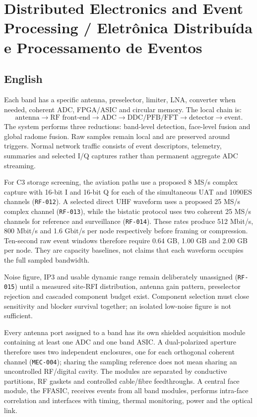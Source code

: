 \chapter{Distributed Electronics and Event Processing / Eletrônica Distribuída e Processamento de Eventos}

\section*{English}
Each band has a specific antenna, preselector, limiter, LNA, converter when needed, coherent ADC, FPGA/ASIC and circular memory. The local chain is:
\[
\text{antenna}\rightarrow\text{RF front-end}\rightarrow\text{ADC}\rightarrow\text{DDC/PFB/FFT}\rightarrow\text{detector}\rightarrow\text{event}.
\]
The system performs three reductions: band-level detection, face-level fusion and global radome fusion. Raw samples remain local and are preserved around triggers. Normal network traffic consists of event descriptors, telemetry, summaries and selected I/Q captures rather than permanent aggregate ADC streaming.

For C3 storage screening, the aviation paths use a proposed 8 MS/s complex capture with 16-bit I and 16-bit Q for each of the simultaneous UAT and 1090ES channels (\texttt{RF-012}). A selected direct UHF waveform uses a proposed 25 MS/s complex channel (\texttt{RF-013}), while the bistatic protocol uses two coherent 25 MS/s channels for reference and surveillance (\texttt{RF-014}). These rates produce 512 Mbit/s, 800 Mbit/s and 1.6 Gbit/s per node respectively before framing or compression. Ten-second raw event windows therefore require 0.64 GB, 1.00 GB and 2.00 GB per node. They are capacity baselines, not claims that each waveform occupies the full sampled bandwidth.

Noise figure, IP3 and usable dynamic range remain deliberately unassigned (\texttt{RF-015}) until a measured site-RFI distribution, antenna gain pattern, preselector rejection and cascaded component budget exist. Component selection must close sensitivity and blocker survival together; an isolated low-noise figure is not sufficient.

Every antenna port assigned to a band has its own shielded acquisition module containing at least one ADC and one band ASIC. A dual-polarized aperture therefore uses two independent enclosures, one for each orthogonal coherent channel (\texttt{MEC-004}); sharing the sampling reference does not mean sharing an uncontrolled RF/digital cavity. The modules are separated by conductive partitions, RF gaskets and controlled cable/fibre feedthroughs. A central face module, the FFASIC, receives events from all band modules, performs intra-face correlation and interfaces with timing, thermal monitoring, power and the optical link.

